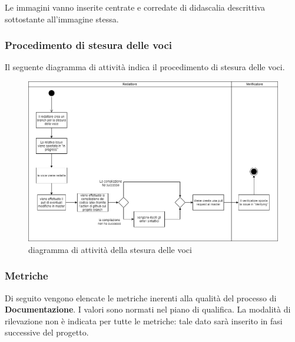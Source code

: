 	    Le immagini vanno inserite centrate e corredate di didascalia descrittiva sottostante all'immagine stessa.
	    
	    \subsubsection{Procedimento di stesura delle voci}
	    Il seguente diagramma di attività indica il procedimento di stesura delle voci.\\
	    
	    \begin{figure}[hbt!]
	       \centering \includegraphics[width=1.0\textwidth]{../_template/images/vociDocumenti.png}
	        \caption{diagramma di attività della stesura delle voci}
	    \end{figure}
	    
	    \subsubsection{Metriche}
		Di seguito vengono elencate le metriche inerenti alla qualità del processo di \textbf{Documentazione}. I valori sono normati nel piano di qualifica. La modalità di rilevazione non è indicata per tutte le metriche: tale dato sarà inserito in fasi successive del progetto.
	    
